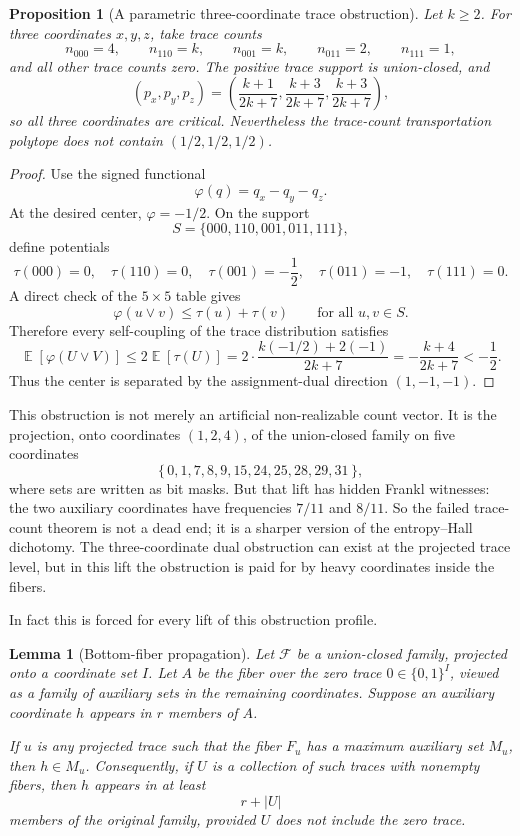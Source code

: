 \documentclass[11pt]{article}
\newtheorem{lemma}{Lemma}
\newtheorem{proposition}{Proposition}
\DeclareMathOperator{\E}{\mathbb{E}}
\begin{document}
\begin{proposition}[A parametric three-coordinate trace obstruction]
Let $k\geq2$.  For three coordinates $x,y,z$, take trace counts
\[
  n_{000}=4,\qquad
  n_{110}=k,\qquad
  n_{001}=k,\qquad
  n_{011}=2,\qquad
  n_{111}=1,
\]
and all other trace counts zero.  The positive trace support is union-closed,
and
\[
  (p_x,p_y,p_z)
  =
  \left(
    \frac{k+1}{2k+7},
    \frac{k+3}{2k+7},
    \frac{k+3}{2k+7}
  \right),
\]
so all three coordinates are critical.  Nevertheless the trace-count
transportation polytope does not contain
$(1/2,1/2,1/2)$.
\end{proposition}

\begin{proof}
Use the signed functional
\[
  \varphi(q)=q_x-q_y-q_z.
\]
At the desired center, $\varphi=-1/2$.  On the support
\[
  S=\{000,110,001,011,111\},
\]
define potentials
\[
  \tau(000)=0,\quad
  \tau(110)=0,\quad
  \tau(001)=-\frac12,\quad
  \tau(011)=-1,\quad
  \tau(111)=0.
\]
A direct check of the $5\times5$ table gives
\[
  \varphi(u\vee v)\leq \tau(u)+\tau(v)
  \qquad\text{for all }u,v\in S.
\]
Therefore every self-coupling of the trace distribution satisfies
\[
  \E[\varphi(U\vee V)]
  \leq
  2\E[\tau(U)]
  =
  2\cdot\frac{k(-1/2)+2(-1)}{2k+7}
  =
  -\frac{k+4}{2k+7}
  <
  -\frac12.
\]
Thus the center is separated by the assignment-dual direction
$(1,-1,-1)$.
\end{proof}

This obstruction is not merely an artificial non-realizable count vector.  It
is the projection, onto coordinates $(1,2,4)$, of the union-closed family on
five coordinates
\[
  \{\,
  0,1,7,8,9,15,24,25,28,29,31
  \,\},
\]
where sets are written as bit masks.  But that lift has hidden Frankl
witnesses: the two auxiliary coordinates have frequencies $7/11$ and $8/11$.
So the failed trace-count theorem is not a dead end; it is a sharper version
of the entropy--Hall dichotomy.  The three-coordinate dual obstruction can
exist at the projected trace level, but in this lift the obstruction is paid
for by heavy coordinates inside the fibers.

In fact this is forced for every lift of this obstruction profile.

\begin{lemma}[Bottom-fiber propagation]
Let $\mathcal{F}$ be a union-closed family, projected onto a coordinate set
$I$.  Let $A$ be the fiber over the zero trace $0\in\{0,1\}^I$, viewed as a
family of auxiliary sets in the remaining coordinates.  Suppose an auxiliary
coordinate $h$ appears in $r$ members of $A$.

If $u$ is any projected trace such that the fiber $F_u$ has a maximum
auxiliary set $M_u$, then $h\in M_u$.  Consequently, if $U$ is a collection
of such traces with nonempty fibers, then $h$ appears in at least
\[
  r+|U|
\]
members of the original family, provided $U$ does not include the zero trace.
\end{lemma}
\end{document}
